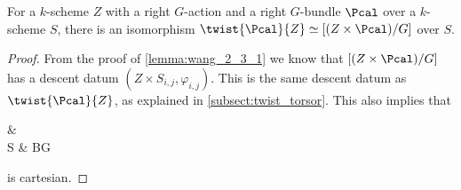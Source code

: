             \begin{corollary}
                \label{corollary:wang_2_3_3}
                For a $k$-scheme $Z$ with a right $G$-action and a right $G$-bundle $\Pcal$ over a $k$-scheme $S$, there is an isomorphism $\twist{\Pcal}{Z} \simeq [(Z \times \Pcal)/G]$ over $S$.
            \end{corollary}
            \begin{proof}
                From the proof of \cref{lemma:wang_2_3_1} we know that $[(Z \times \Pcal)/G]$ has a descent datum $(Z \times S_{i,j}, \varphi_{i,j})$. This is the same descent datum as $\twist{\Pcal}{Z}$, as explained in \cref{subsect:twist_torsor}. This also implies that 
                \begin{diag}
                     \ar[d] \ar[r] & \left[Z/G\right] \ar[d] \\
                    S \ar[r, "\Pcal"] & BG
                \end{diag}
                is cartesian.
            \end{proof}

